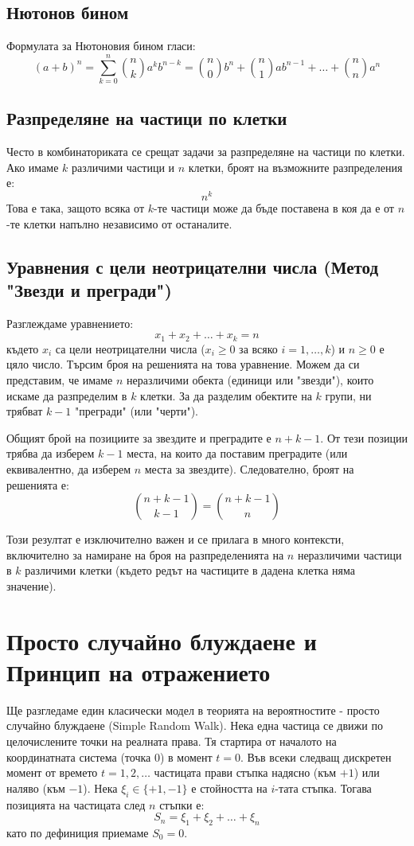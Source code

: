 \documentclass[12pt]{article}
\begin{document}
\subsection{Нютонов бином}
Формулата за Нютоновия бином гласи:
\[ (a+b)^n = \sum_{k=0}^{n} \binom{n}{k} a^k b^{n-k} = \binom{n}{0} b^n + \binom{n}{1} ab^{n-1} + \dots + \binom{n}{n} a^n \]

\subsection{Разпределяне на частици по клетки}
Често в комбинаториката се срещат задачи за разпределяне на частици по клетки.
Ако имаме $k$ различими частици и $n$ клетки, броят на възможните разпределения е:
\[ n^k \]
Това е така, защото всяка от $k$-те частици може да бъде поставена в коя да е от $n$-те клетки напълно независимо от останалите.

\subsection{Уравнения с цели неотрицателни числа (Метод "Звезди и прегради")}
Разглеждаме уравнението:
\[ x_1 + x_2 + \dots + x_k = n \]
където $x_i$ са цели неотрицателни числа ($x_i \geq 0$ за всяко $i=1,\dots,k$) и $n \geq 0$ е цяло число.
Търсим броя на решенията на това уравнение. Можем да си представим, че имаме $n$ неразличими обекта (единици или "звезди"), които искаме да разпределим в $k$ клетки. За да разделим обектите на $k$ групи, ни трябват $k-1$ "прегради" (или "черти"). 

Общият брой на позициите за звездите и преградите е $n + k - 1$. От тези позиции трябва да изберем $k-1$ места, на които да поставим преградите (или еквивалентно, да изберем $n$ места за звездите). 
Следователно, броят на решенията е:
\[ \binom{n+k-1}{k-1} = \binom{n+k-1}{n} \]

Този резултат е изключително важен и се прилага в много контексти, включително за намиране на броя на разпределенията на $n$ неразличими частици в $k$ различими клетки (където редът на частиците в дадена клетка няма значение).

\section{Просто случайно блуждаене и Принцип на отражението}

Ще разгледаме един класически модел в теорията на вероятностите - просто случайно блуждаене (Simple Random Walk).
Нека една частица се движи по целочислените точки на реалната права. Тя стартира от началото на координатната система (точка 0) в момент $t=0$. Във всеки следващ дискретен момент от времето $t=1, 2, \dots$ частицата прави стъпка надясно (към $+1$) или наляво (към $-1$).
Нека $\xi_i \in \{+1, -1\}$ е стойността на $i$-тата стъпка. Тогава позицията на частицата след $n$ стъпки е:
\[ S_n = \xi_1 + \xi_2 + \dots + \xi_n \]
като по дефиниция приемаме $S_0 = 0$.
\end{document}
